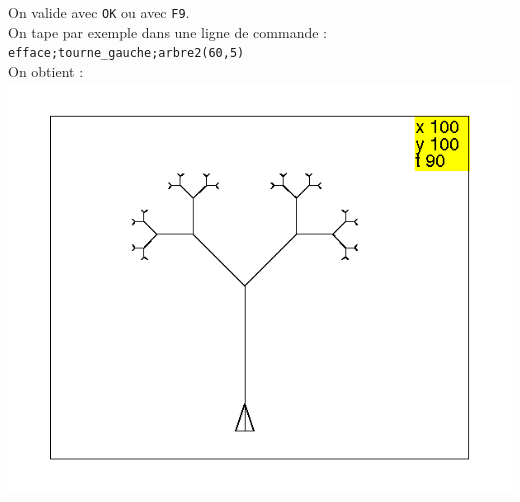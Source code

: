 \documentclass[a4paper,11pt]{book}
\begin{document}
On valide avec {\tt OK} ou avec {\tt F9}.\\
On tape par exemple dans une ligne de commande :\\
{\tt efface;tourne\_gauche;arbre2(60,5)}\\
On obtient :\\
\includegraphics[width=\textwidth]{tortarb2}\\
\end{document}
